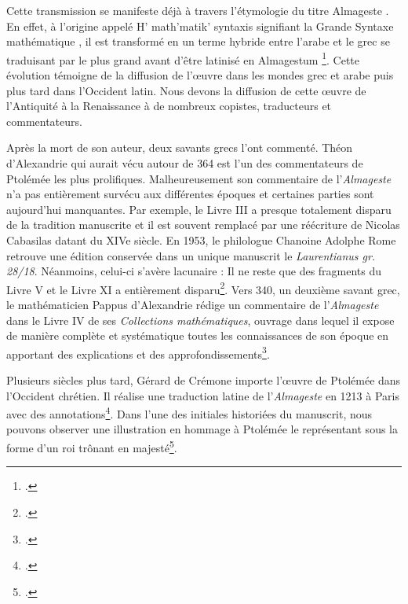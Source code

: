 Cette transmission se manifeste déjà à travers l'étymologie du titre \og Almageste \fg. En effet, à l'origine appelé \og H' math'matik' syntaxis \fg signifiant la \og Grande Syntaxe mathématique \fg, il est transformé en un terme hybride entre l'arabe et le grec se traduisant par \og le plus grand \fg avant d'être latinisé en \og Almagestum \fg\footcite{raymondjonesPtolemyAccomplishmentsBiography2025}. Cette évolution témoigne de la diffusion de l'œuvre dans les mondes grec et arabe puis plus tard dans l'Occident latin. Nous devons la diffusion de cette œuvre de l'Antiquité à la Renaissance à de nombreux copistes, traducteurs et commentateurs. 

Après la mort de son auteur, deux savants grecs l'ont commenté. Théon d'Alexandrie qui aurait vécu autour de 364 est l'un des commentateurs de Ptolémée les plus prolifiques. Malheureusement son commentaire de l'\textit{Almageste} n'a pas entièrement survécu aux différentes époques et certaines parties sont aujourd'hui manquantes. Par exemple, le Livre III a presque totalement disparu de la tradition manuscrite et il est souvent remplacé par une réécriture de Nicolas Cabasilas datant du XIVe siècle. 
En 1953, le philologue Chanoine Adolphe Rome retrouve une édition conservée dans un unique manuscrit le \textit{Laurentianus gr. 28/18}. Néanmoins, celui-ci s'avère lacunaire : Il ne reste que des fragments du Livre V et le Livre XI a entièrement disparu\footcite{tihonLivreRetrouveCommentaire1987}. Vers 340, un deuxième savant grec, le mathématicien Pappus d'Alexandrie rédige un commentaire de l'\textit{Almageste} dans le Livre IV de ses \textit{Collections mathématiques}, ouvrage dans lequel il expose de manière complète et systématique toutes les connaissances de son époque en apportant des explications et des approfondissements\footcite{meyerPAPPUS1999}. 

Plusieurs siècles plus tard, Gérard de Crémone importe l'œuvre de Ptolémée dans l'Occident chrétien. 
Il réalise une traduction latine de l'\textit{Almageste} en 1213 à Paris avec des annotations\footcite{ptolemaeusPtolomeusAlmagestumTransl1213}. 
Dans l'une des initiales historiées du manuscrit, nous pouvons observer une illustration en hommage  à Ptolémée le représentant sous la forme d'un roi trônant en majesté\footcite{TraductionLatineLAlmageste}. 


